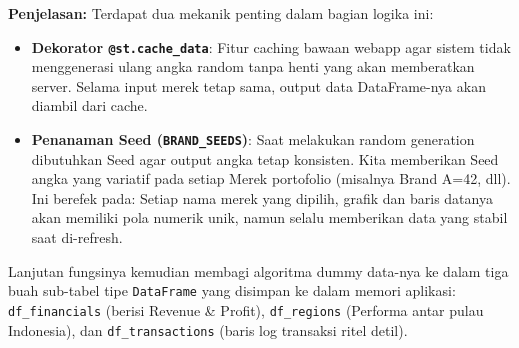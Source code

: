 \documentclass{article}
\begin{document}
\textbf{Penjelasan:}
Terdapat dua mekanik penting dalam bagian logika ini:
\begin{itemize}
	\item \textbf{Dekorator \texttt{@st.cache\_data}}: Fitur caching bawaan webapp agar sistem tidak menggenerasi ulang angka random tanpa henti yang akan memberatkan server. Selama input merek tetap sama, output data DataFrame-nya akan diambil dari cache.
	\item \textbf{Penanaman Seed (\texttt{BRAND\_SEEDS})}: Saat melakukan random generation dibutuhkan Seed agar output angka tetap konsisten. Kita memberikan Seed angka yang variatif pada setiap Merek portofolio (misalnya Brand A=42, dll). Ini berefek pada: Setiap nama merek yang dipilih, grafik dan baris datanya akan memiliki pola numerik unik, namun selalu memberikan data yang stabil saat di-refresh.
\end{itemize}

Lanjutan fungsinya kemudian membagi algoritma dummy data-nya ke dalam tiga buah sub-tabel tipe \texttt{DataFrame} yang disimpan ke dalam memori aplikasi: \texttt{df\_financials} (berisi Revenue \& Profit), \texttt{df\_regions} (Performa antar pulau Indonesia), dan \texttt{df\_transactions} (baris log transaksi ritel detil).
\end{document}
